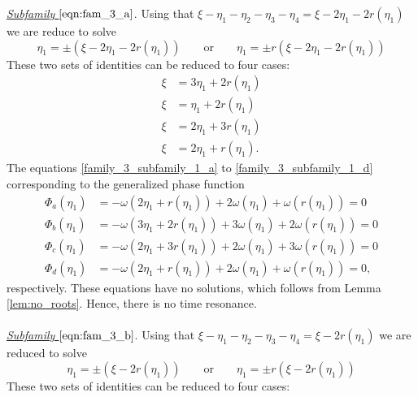 \documentclass[reqno,english,11pt]{amsart}
\theoremstyle{definition}
\numberwithin{equation}{section}
\begin{document}
\noindent
{\it \underline{Subfamily $\eqref{eqn:fam_3_a}$}}.
Using that $\xi-\eta_1-\eta_2-\eta_3-\eta_4=\xi-2\eta_1-2r(\eta_1)$ we are reduce to solve
$$\eta_1=\pm\left(\xi-2\eta_1-2r(\eta_1)\right)\qquad \text{or}\qquad \eta_1=\pm r(\xi-2\eta_1-2r(\eta_1))$$
These two sets of identities can be reduced to four cases:
\begin{subequations}
    \begin{align}
         \xi&=3\eta_1+2r(\eta_1) \tag{a} \label{family_3_subfamily_1_a}
  \\
  \xi&=\eta_1+2r(\eta_1) \tag{b} \label{family_3_subfamily_1_b}
 \\
  \xi&=2\eta_1+3r(\eta_1) \tag{c} \label{family_3_subfamily_1_c}
 \\
   \xi&= 2\eta_1+r(\eta_1). \tag{d} \label{family_3_subfamily_1_d}
    \end{align} 
\end{subequations}
The equations \eqref{family_3_subfamily_1_a} to \eqref{family_3_subfamily_1_d} corresponding to the generalized phase function 
\begin{align*}
    \Phi_a(\eta_1)&=-\omega(2\eta_1+r(\eta_1))+2\omega(\eta_1)+\omega(r(\eta_1))=0\\
    \Phi_b(\eta_1)&=-\omega(3\eta_1+2r(\eta_1))+3\omega(\eta_1)+2\omega(r(\eta_1))=0\\
    \Phi_c(\eta_1)&=-\omega(2\eta_1+3r(\eta_1))+2\omega(\eta_1)+3\omega(r(\eta_1))=0\\
    \Phi_d(\eta_1)&=-\omega(2\eta_1+r(\eta_1))+2\omega(\eta_1)+\omega(r(\eta_1))=0,
\end{align*}
respectively. These equations have no solutions, which follows from Lemma \ref{lem:no_roots}. 
Hence, there is no time resonance.
\\\\
\noindent
{\it \underline{Subfamily $\eqref{eqn:fam_3_b}$}}.
Using that $\xi-\eta_1-\eta_2-\eta_3-\eta_4=\xi-2r(\eta_1)$ we are reduced to solve
$$\eta_1=\pm\left(\xi-2r(\eta_1)\right)\qquad \text{or}\qquad \eta_1=\pm r(\xi-2r(\eta_1))$$
These two sets of identities can be reduced to four cases:
\end{document}
